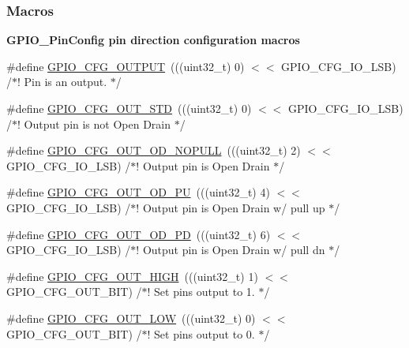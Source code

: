 \subsubsection*{Macros}
\begin{Indent}{\bf G\+P\+I\+O\+\_\+\+Pin\+Config pin direction configuration macros}\par
\begin{DoxyCompactItemize}
\item 
\#define \hyperlink{_g_p_i_o_8h_aad0c4b9c093f1d57fd03061b7456193a}{G\+P\+I\+O\+\_\+\+C\+F\+G\+\_\+\+O\+U\+T\+P\+U\+T}~(((uint32\+\_\+t) 0) $<$$<$ G\+P\+I\+O\+\_\+\+C\+F\+G\+\_\+\+I\+O\+\_\+\+L\+S\+B) /$\ast$! Pin is an output. $\ast$/
\item 
\#define \hyperlink{_g_p_i_o_8h_ac52528c42a8eb3be193f49de5ed7d820}{G\+P\+I\+O\+\_\+\+C\+F\+G\+\_\+\+O\+U\+T\+\_\+\+S\+T\+D}~(((uint32\+\_\+t) 0) $<$$<$ G\+P\+I\+O\+\_\+\+C\+F\+G\+\_\+\+I\+O\+\_\+\+L\+S\+B) /$\ast$! Output pin is not Open Drain $\ast$/
\item 
\#define \hyperlink{_g_p_i_o_8h_ae660060d38901c2370d8f104fbb842a2}{G\+P\+I\+O\+\_\+\+C\+F\+G\+\_\+\+O\+U\+T\+\_\+\+O\+D\+\_\+\+N\+O\+P\+U\+L\+L}~(((uint32\+\_\+t) 2) $<$$<$ G\+P\+I\+O\+\_\+\+C\+F\+G\+\_\+\+I\+O\+\_\+\+L\+S\+B) /$\ast$! Output pin is Open Drain $\ast$/
\item 
\#define \hyperlink{_g_p_i_o_8h_a16cfdcae58be5f77932b36f43e7c1d2f}{G\+P\+I\+O\+\_\+\+C\+F\+G\+\_\+\+O\+U\+T\+\_\+\+O\+D\+\_\+\+P\+U}~(((uint32\+\_\+t) 4) $<$$<$ G\+P\+I\+O\+\_\+\+C\+F\+G\+\_\+\+I\+O\+\_\+\+L\+S\+B) /$\ast$! Output pin is Open Drain w/ pull up $\ast$/
\item 
\#define \hyperlink{_g_p_i_o_8h_af4e7be1d009ff2c25a048ab7fe401d88}{G\+P\+I\+O\+\_\+\+C\+F\+G\+\_\+\+O\+U\+T\+\_\+\+O\+D\+\_\+\+P\+D}~(((uint32\+\_\+t) 6) $<$$<$ G\+P\+I\+O\+\_\+\+C\+F\+G\+\_\+\+I\+O\+\_\+\+L\+S\+B) /$\ast$! Output pin is Open Drain w/ pull dn $\ast$/
\item 
\#define \hyperlink{_g_p_i_o_8h_ae86eb6dc677c962a9ad94bdad6752dc0}{G\+P\+I\+O\+\_\+\+C\+F\+G\+\_\+\+O\+U\+T\+\_\+\+H\+I\+G\+H}~(((uint32\+\_\+t) 1) $<$$<$ G\+P\+I\+O\+\_\+\+C\+F\+G\+\_\+\+O\+U\+T\+\_\+\+B\+I\+T) /$\ast$! Set pin\textquotesingle{}s output to 1. $\ast$/
\item 
\#define \hyperlink{_g_p_i_o_8h_ad4fd3be9a7bec74d862cb1caecc5d4be}{G\+P\+I\+O\+\_\+\+C\+F\+G\+\_\+\+O\+U\+T\+\_\+\+L\+O\+W}~(((uint32\+\_\+t) 0) $<$$<$ G\+P\+I\+O\+\_\+\+C\+F\+G\+\_\+\+O\+U\+T\+\_\+\+B\+I\+T) /$\ast$! Set pin\textquotesingle{}s output to 0. $\ast$/
\item 
$$
\end{DoxyCompactItemize}
\end{Indent}
